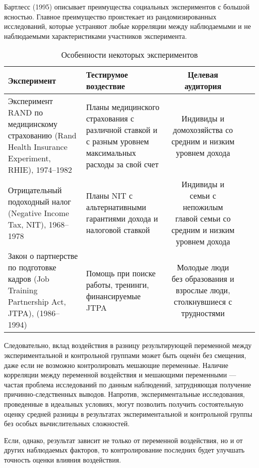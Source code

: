 Бартлесс (1995) описывает преимущества социальных экспериментов с большой ясностью. Главное преимущество проистекает из рандомизированных исследований, которые устраняют любые корреляции между наблюдаемыми и не наблюдаемыми характеристиками участников эксперимента.

\begin{table}[h]
\begin{center}
\caption{\label{tab:exppart}Особенности некоторых экспериментов}
\begin{tabular}[t]{llcll|}
\hline
\bf{Эксперимент} & \bf{Тестирумое воздествие} & \bf{Целевая аудитория} \\
\hline
Эксперимент RAND по медицинскому страхованию (Rand Health Insurance Experiment, RHIE), 1974–1982 & Планы медицинского страхования с различной ставкой и с разным уровнем максимальных расходы за свой счет  & Индивиды и домохозяйства со средним и низким уровнем дохода \\
Отрицательный подоходный налог (Negative Income Tax, NIT), 1968–1978 & Планы NIT с альтернативными гарантиями дохода и налоговой ставкой & Индивиды и семьи с непожилым главой семьи со средним и низким уровнем дохода \\
Закон о партнерстве по подготовке кадров (Job Training Partnership Act, JTPA), (1986–1994)& Помощь при поиске работы, тренинги, финансируемые JTPA & Молодые люди без образования и взрослые люди, столкнувшиеся с трудностями \\
\hline
\end{tabular}
\end{center}
\end{table}



Следовательно, вклад воздействия в разницу результирующей переменной между экспериментальной и контрольной группами может быть оценён без смещения, даже если не возможно контролировать мешающие переменные. Наличие корреляции между переменной воздействия и мешающими переменными --- частая проблема исследований по данным наблюдений, затрудняющая получение причинно-следственных выводов. Напротив, экспериментальные исследования, проведенные в идеальных условиях, могут позволить получить состоятельную оценку средней разницы в результатах экспериментальной  и контрольной группы без особых вычислительных сложностей.


Если, однако, результат зависит не только от переменной воздействия, но и от  других наблюдаемых факторов, то контролирование последних будет улучшать точность оценки влияния воздействия.



